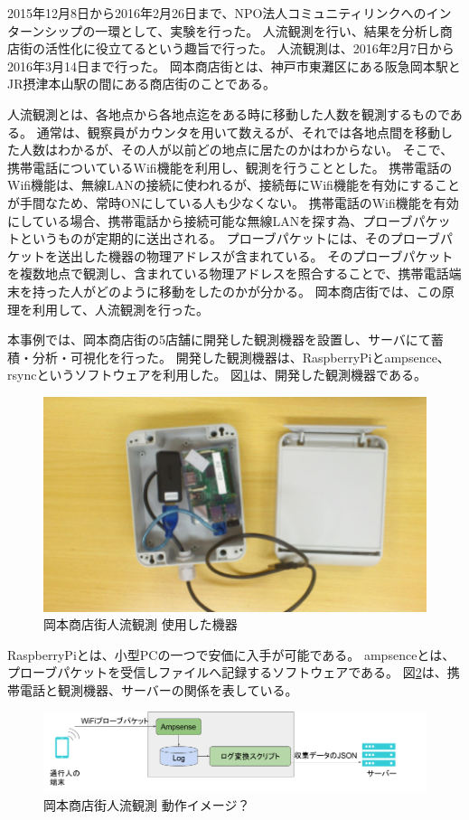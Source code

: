 2015年12月8日から2016年2月26日まで、NPO法人コミュニティリンクへのインターンシップの一環として、実験を行った。
人流観測を行い、結果を分析し商店街の活性化に役立てるという趣旨で行った。
人流観測は、2016年2月7日から2016年3月14日まで行った。
岡本商店街とは、神戸市東灘区にある阪急岡本駅とJR摂津本山駅の間にある商店街のことである。

人流観測とは、各地点から各地点迄をある時に移動した人数を観測するものである。
通常は、観察員がカウンタを用いて数えるが、それでは各地点間を移動した人数はわかるが、その人が以前どの地点に居たのかはわからない。
そこで、携帯電話についているWifi機能を利用し、観測を行うこととした。
携帯電話のWifi機能は、無線LANの接続に使われるが、接続毎にWifi機能を有効にすることが手間なため、常時ONにしている人も少なくない。
携帯電話のWifi機能を有効にしている場合、携帯電話から接続可能な無線LANを探す為、プローブパケットというものが定期的に送出される。
プローブパケットには、そのプローブパケットを送出した機器の物理アドレスが含まれている。
そのプローブパケットを複数地点で観測し、含まれている物理アドレスを照合することで、携帯電話端末を持った人がどのように移動をしたのかが分かる。
岡本商店街では、この原理を利用して、人流観測を行った。

本事例では、岡本商店街の5店舗に開発した観測機器を設置し、サーバにて蓄積・分析・可視化を行った。
開発した観測機器は、RaspberryPiとampsence、rsyncというソフトウェアを利用した。
図\ref{fig:okamoto_pict1}は、開発した観測機器である。
\begin{figure}[htbp]
\includegraphics[width=16cm]{images/okamoto_pict1.png}
\caption{岡本商店街人流観測 使用した機器}
\label{fig:okamoto_pict1}
\end{figure}

RaspberryPiとは、小型PCの一つで安価に入手が可能である。
ampsenceとは、プローブパケットを受信しファイルへ記録するソフトウェアである。
図\ref{fig:okamoto_pict2}は、携帯電話と観測機器、サーバーの関係を表している。
\begin{figure}[htbp]
\includegraphics[width=16cm]{images/okamoto_pict2.png}
\caption{岡本商店街人流観測 動作イメージ？}
\label{fig:okamoto_pict2}
\end{figure}

